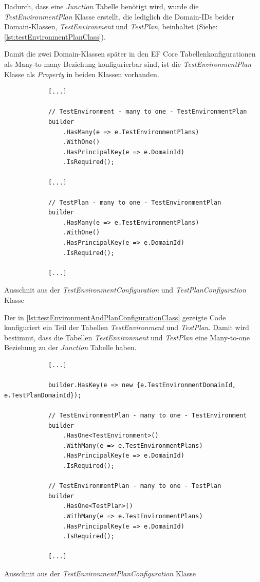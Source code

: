 \documentclass[a4paper, fontsize=11pt, parskip=half, twoside]{scrreprt}
\begin{document}
	Dadurch, dass eine \emph{Junction} Tabelle benötigt wird, wurde die \emph{TestEnvironmentPlan} Klasse erstellt, die lediglich die Domain-\ac{ID}s beider Domain-Klassen, \emph{TestEnvironment} und \emph{TestPlan}, beinhaltet (Siehe: \autoref{lst:testEnvironmentPlanClass}).
	
	Damit die zwei Domain-Klassen später in den \ac{EF} Core Tabellenkonfigurationen als Many-to-many Beziehung konfigurierbar sind, ist die \emph{TestEnvironmentPlan} Klasse als \emph{Property} in beiden Klassen vorhanden.
	
	\begin{listing}[ht]
		\begin{verbatim}
			[...]
			
			// TestEnvironment - many to one - TestEnvironmentPlan
			builder
				.HasMany(e => e.TestEnvironmentPlans)
				.WithOne()
				.HasPrincipalKey(e => e.DomainId)
				.IsRequired();
				
			[...]
				
			// TestPlan - many to one - TestEnvironmentPlan
			builder
				.HasMany(e => e.TestEnvironmentPlans)
				.WithOne()
				.HasPrincipalKey(e => e.DomainId)
				.IsRequired();	
				
			[...]
		\end{verbatim}
		\caption{Ausschnit aus der \emph{TestEnvironmentConfiguration} und \emph{TestPlanConfiguration} Klasse}
		\label{lst:testEnvironmentAndPlanConfigurationClass}
	\end{listing}

	Der in \autoref{lst:testEnvironmentAndPlanConfigurationClass} gezeigte Code konfiguriert ein Teil der Tabellen \emph{TestEnvironment} und \emph{TestPlan}.
	Damit wird bestimmt, dass die Tabellen \emph{TestEnvironment} und \emph{TestPlan} eine Many-to-one Beziehung zu der \emph{Junction} Tabelle haben.

	\begin{listing}[ht]
		\begin{verbatim}
			[...]
			
			builder.HasKey(e => new {e.TestEnvironmentDomainId, e.TestPlanDomainId});
			
			// TestEnvironmentPlan - many to one - TestEnvironment
			builder
				.HasOne<TestEnvironment>()
				.WithMany(e => e.TestEnvironmentPlans)
				.HasPrincipalKey(e => e.DomainId)
				.IsRequired();
				
			// TestEnvironmentPlan - many to one - TestPlan
			builder
				.HasOne<TestPlan>()
				.WithMany(e => e.TestEnvironmentPlans)
				.HasPrincipalKey(e => e.DomainId)
				.IsRequired();
			
			[...]
		\end{verbatim}
		\caption{Ausschnit aus der \emph{TestEnvironmentPlanConfiguration} Klasse}
		\label{lst:testEnvironmentPlanConfigurationClass}
	\end{listing}
\end{document}
